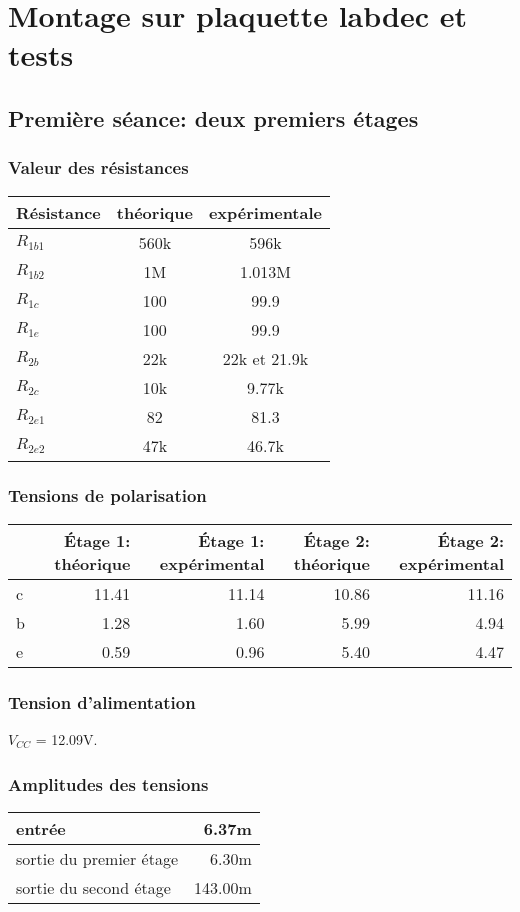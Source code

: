 \chapter{Montage sur plaquette labdec et tests}
\section{Première séance: deux premiers étages}
\subsection{Valeur des résistances}
\begin{tabular}{|l|c|c|}
    \hline
    Résistance & théorique & expérimentale \\
    \hline
    $R_{1b1}$ & 560k & 596k \\
    \hline
    $R_{1b2}$ & 1M & 1.013M \\
    \hline
    $R_{1c}$ & 100 & 99.9 \\
    \hline
    $R_{1e}$ & 100 & 99.9 \\
    \hline
    \hline
    $R_{2b}$ & 22k & 22k et 21.9k \\
    \hline
    $R_{2c}$ & 10k & 9.77k \\
    \hline
    $R_{2e1}$ & 82 & 81.3 \\
    \hline
    $R_{2e2}$ & 47k & 46.7k \\
    \hline
\end{tabular}

\subsection{Tensions de polarisation}
\begin{tabular}{|l|r|r|r|r|}
    \hline
    & Étage 1: théorique & Étage 1: expérimental & Étage 2: théorique & Étage 2: expérimental \\
    \hline
    c & 11.41 & 11.14 & 10.86 & 11.16 \\
    \hline
    b & 1.28 & 1.60 & 5.99 & 4.94 \\
    \hline
    e & 0.59 & 0.96 & 5.40 & 4.47 \\
    \hline
\end{tabular}

\subsection{Tension d’alimentation}
$V_{CC}$ = 12.09V.

\subsection{Amplitudes des tensions}
\begin{tabular}{|l|r|}
    \hline
    entrée & 6.37m \\
    \hline
    sortie du premier étage & 6.30m \\
    \hline
    sortie du second étage & 143.00m \\
    \hline
\end{tabular}

